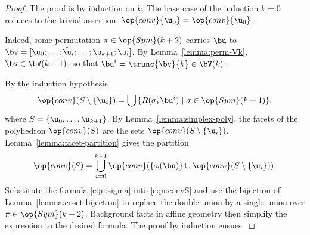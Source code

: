 \begin{proof} The proof is by induction on $k$.  The base case of the
  induction $k=0$ reduces to the trivial assertion: $\op{conv}\{\u_0\}
  = \op{conv}\{\u_0\}$.



    Indeed, some
  permutation $\pi\in \op{Sym}(k+2)$ carries $\bu$ to
  $\bv=[\u_0;\ldots;\hat\u_i;\ldots;\u_{k+1};\u_i]$.  By
  Lemma~\ref{lemma:perm-Vk}, $\bv\in \bV(k+1)$, so that $\bu^i =
  \trunc{\bv}{k}\in \bV(k)$.

  By the induction hypothesis
\begin{equation}\label{eqn:sigma} 
\op{conv}(S\setminus\{\u_i\}) = \bigcup \,\{ R(\sigma_*\bu^i) \mid \sigma\in \op{Sym}(k+1)\},
\end{equation}
where $S = \{\u_0,\ldots,\u_{k+1}\}$.  By
Lemma~\ref{lemma:simplex-poly}, the facets of the polyhedron
$\op{conv}(S)$ are the sets $\op{conv}(S\setminus\{\u_i\})$.
Lemma~\ref{lemma:facet-partition} gives the partition
\begin{equation} \label{eqn:convS}
\op{conv}(S) = \bigcup_{i=0}^{k+1} \op{conv}(\{\omega(\bu)\}
\cup \op{conv}(S\setminus\{\u_i\})).
\end{equation}
Substitute the formula \eqref{eqn:sigma} into \eqref{eqn:convS} and
use the bijection of Lemma~\ref{lemma:coset-bijection} to replace the
double union by a single union over $\pi\in \op{Sym}(k+2)$.
Background facts in affine geometry then simplify the expression to
the desired formula.  The proof by induction ensues.
%
%
%
\end{proof}



